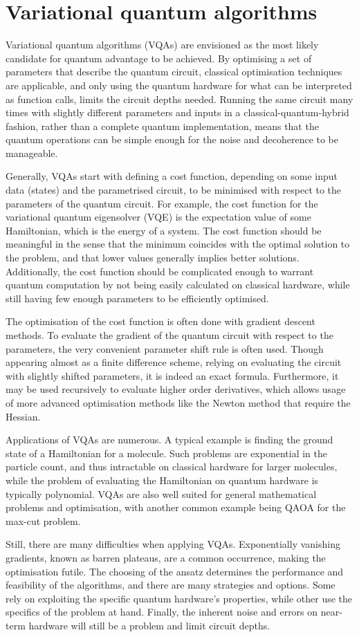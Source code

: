 \section{Variational quantum algorithms}
\label{sec:vqa}
Variational quantum algorithms (VQAs) are envisioned as the most likely candidate for quantum advantage to be achieved.
By optimising a set of parameters that describe the quantum circuit, classical optimisation techniques are applicable, and only using the quantum hardware for what can be interpreted as function calls, limits the circuit depths needed.
Running the same circuit many times with slightly different parameters and inputs in a classical-quantum-hybrid fashion, rather than a complete quantum implementation, means that the quantum operations can be simple enough for the noise and decoherence to be manageable.

Generally, VQAs start with defining a cost function, depending on some input data (states) and the parametrised circuit, to be minimised with respect to the parameters of the quantum circuit.
For example, the cost function for the variational quantum eigensolver (VQE) is the expectation value of some Hamiltonian, which is the energy of a system.
The cost function should be meaningful in the sense that the minimum coincides with the optimal solution to the problem, and that lower values generally implies better solutions.
Additionally, the cost function should be complicated enough to warrant quantum computation by not being easily calculated on classical hardware, while still having few enough parameters to be efficiently optimised.

The optimisation of the cost function is often done with gradient descent methods.
To evaluate the gradient of the quantum circuit with respect to the parameters, the very convenient parameter shift rule is often used.
Though appearing almost as a finite difference scheme, relying on evaluating the circuit with slightly shifted parameters, it is indeed an exact formula.
Furthermore, it may be used recursively to evaluate higher order derivatives, which allows usage of more advanced optimisation methods like the Newton method that require the Hessian.

Applications of VQAs are numerous.
A typical example is finding the ground state of a Hamiltonian for a molecule.
Such problems are exponential in the particle count, and thus intractable on classical hardware for larger molecules, while the problem of evaluating the Hamiltonian on quantum hardware is typically polynomial.
VQAs are also well suited for general mathematical problems and optimisation, with another common example being QAOA for the max-cut problem.

Still, there are many difficulties when applying VQAs.
Exponentially vanishing gradients, known as barren plateaus, are a common occurrence, making the optimisation futile.
The choosing of the ansatz determines the performance and feasibility of the algorithms, and there are many strategies and options.
Some rely on exploiting the specific quantum hardware's properties, while other use the specifics of the problem at hand.
Finally, the inherent noise and errors on near-term hardware will still be a problem and limit circuit depths.